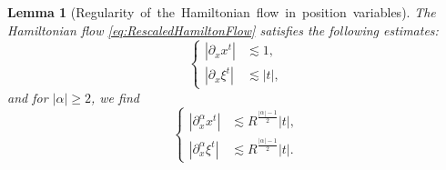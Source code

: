 \documentclass{amsart}
\newtheorem{lemma}[theorem]{Lemma}
\theoremstyle{definition}
\begin{document}
\begin{lemma}[Regularity~of~the~Hamiltonian~flow~in~position~variables]
\label{lem:HamiltonFlowPositionRegularity}
The Hamiltonian flow \eqref{eq:RescaledHamiltonFlow} satisfies the following estimates:
\begin{equation}
\label{eq:RegularityHamiltonFlowSpatialI}
\left\{ \begin{array}{cl}
|\partial_x x^t| &\lesssim 1, \\
|\partial_x \xi^t| &\lesssim |t|,
\end{array} \right.
\end{equation}
and for $|\alpha| \geq 2$, we find
\begin{equation}
\label{eq:RegularityHamiltonFlowSpatialII}
\left\{ \begin{array}{cl}
|\partial_x^{\alpha} x^t| &\lesssim R^{\frac{|\alpha|-1}{2}} |t|, \\
|\partial_x^{\alpha} \xi^t| &\lesssim R^{\frac{|\alpha|-1}{2}} |t|.
\end{array} \right.
\end{equation}
\end{lemma}
\end{document}
